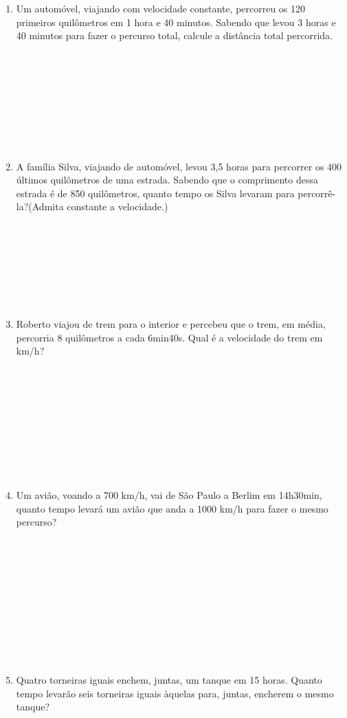 \documentclass[a4paper,14pt]{article}
\begin{document}
\begin{multicols}{2}
\begin{enumerate}
	    	\item Um automóvel, viajando com velocidade constante, percorreu os 120 primeiros quilômetros em 1 hora e 40 minutos. Sabendo que levou 3 horas e 40 minutos para fazer o percurso total, calcule a distância total percorrida. \\\\\\\\\\\\\\\\\\
	    	\item A família Silva, viajando de automóvel, levou 3,5 horas para percorrer os 400 últimos quilômetros de uma estrada. Sabendo que o comprimento dessa estrada é de 850 quilômetros, quanto tempo os Silva levaram para percorrê-la?(Admita constante a velocidade.) \\\\\\\\\\\\\\\\
	    	\item Roberto viajou de trem para o interior e percebeu que o trem, em média, percorria 8 quilômetros a cada 6min40s. Qual é a velocidade do trem em km/h? \\\\\\\\\\\\\\\\\\\\
	    	\item Um avião, voando a 700 km/h, vai de São Paulo a Berlim em 14h30min, quanto tempo levará um avião que anda a 1000 km/h para fazer o mesmo percurso? \\\\\\\\\\\\\\\\\\\\\\
	    	\item Quatro torneiras iguais enchem, juntas, um tanque em 15 horas. Quanto tempo levarão seis torneiras iguais àquelas para, juntas, encherem o mesmo tanque? \\\\\\\\\\\\\\\\\\\\

\end{enumerate}
\end{multicols}
\end{document}

